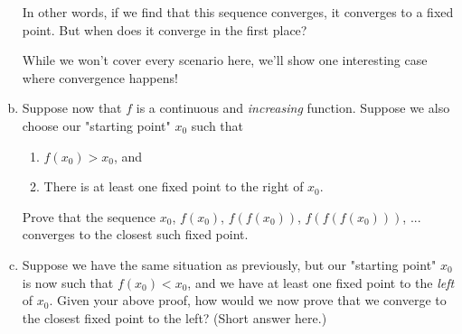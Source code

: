 \begin{problem}
\begin{enumerate}[(a)]
\vspace{10mm}
In other words, if we find that this sequence converges, it converges to a fixed point. But when does it converge in the first place? 

While we won't cover every scenario here, we'll show one interesting case where convergence happens!


\item Suppose now that $f$ is a continuous and \emph{increasing} function. Suppose we also choose our "starting point" $x_0$ such that 

\vspace{10mm}
\begin{enumerate}[(1)]
\item $f(x_0) > x_0$, and
\item There is at least one fixed point to the right of $x_0$.
\end{enumerate}

Prove that the sequence $x_0$, $f(x_0)$, $f(f(x_0))$, $f(f(f(x_0)))$, ... converges to the closest such fixed point.



\item Suppose we have the same situation as previously, but our "starting point" $x_0$ is now such that $f(x_0) < x_0$, and we have at least one fixed point to the \emph{left} of $x_0$. Given your above proof, how would we now prove that we converge to the closest fixed point to the left? (Short answer here.)




\end{enumerate}
\end{problem}



